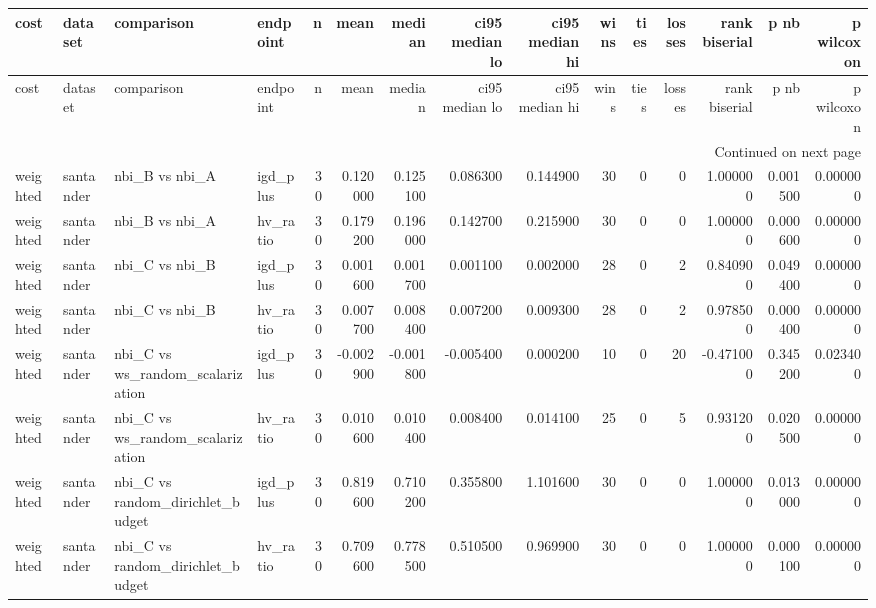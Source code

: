\begin{landscape}
\begin{center}\label{tab:s5eff}\end{center}
\begingroup\tiny\setlength{\tabcolsep}{2.5pt}
\begin{longtable}{llllrrrrrrrrrrr}
\toprule
cost & dataset & comparison & endpoint & n & mean & median & ci95 median lo & ci95 median hi & wins & ties & losses & rank biserial & p nb & p wilcoxon \\
\midrule
\endfirsthead
\toprule
cost & dataset & comparison & endpoint & n & mean & median & ci95 median lo & ci95 median hi & wins & ties & losses & rank biserial & p nb & p wilcoxon \\
\midrule
\endhead
\midrule
\multicolumn{15}{r}{Continued on next page} \\
\midrule
\endfoot
\bottomrule
\endlastfoot
weighted & santander & nbi\_B vs nbi\_A & igd\_plus & 30 & 0.120000 & 0.125100 & 0.086300 & 0.144900 & 30 & 0 & 0 & 1.000000 & 0.001500 & 0.000000 \\
weighted & santander & nbi\_B vs nbi\_A & hv\_ratio & 30 & 0.179200 & 0.196000 & 0.142700 & 0.215900 & 30 & 0 & 0 & 1.000000 & 0.000600 & 0.000000 \\
weighted & santander & nbi\_C vs nbi\_B & igd\_plus & 30 & 0.001600 & 0.001700 & 0.001100 & 0.002000 & 28 & 0 & 2 & 0.840900 & 0.049400 & 0.000000 \\
weighted & santander & nbi\_C vs nbi\_B & hv\_ratio & 30 & 0.007700 & 0.008400 & 0.007200 & 0.009300 & 28 & 0 & 2 & 0.978500 & 0.000400 & 0.000000 \\
weighted & santander & nbi\_C vs ws\_random\_scalarization & igd\_plus & 30 & -0.002900 & -0.001800 & -0.005400 & 0.000200 & 10 & 0 & 20 & -0.471000 & 0.345200 & 0.023400 \\
weighted & santander & nbi\_C vs ws\_random\_scalarization & hv\_ratio & 30 & 0.010600 & 0.010400 & 0.008400 & 0.014100 & 25 & 0 & 5 & 0.931200 & 0.020500 & 0.000000 \\
weighted & santander & nbi\_C vs random\_dirichlet\_budget & igd\_plus & 30 & 0.819600 & 0.710200 & 0.355800 & 1.101600 & 30 & 0 & 0 & 1.000000 & 0.013000 & 0.000000 \\
weighted & santander & nbi\_C vs random\_dirichlet\_budget & hv\_ratio & 30 & 0.709600 & 0.778500 & 0.510500 & 0.969900 & 30 & 0 & 0 & 1.000000 & 0.000100 & 0.000000 \\

\end{longtable}
\end{landscape}
